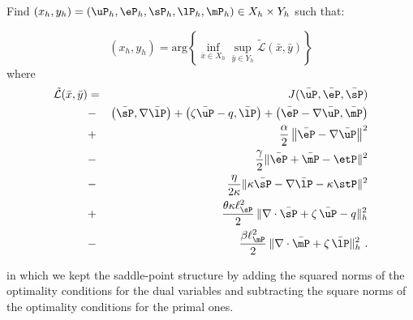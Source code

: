 \begin{tcolorbox}[colback=black!10!white, boxrule=0pt, halign=justify]
	\begin{problem*}[P2$_{h}$]
		Find $(x_h,y_h)=\left ( \uP_h, \eP_h, \sP_h, \lP_h, \mP_h\right ) \in X_h\times Y_h$ such that:
		
		\begin{equation}
			(x_h,y_h)= \mbox{arg} \left \{ \inf_{\bar{x}\in X_h} \sup_{\bar{y}\in Y_h} 
			\tilde{\mathcal{L}}(\bar{x},\bar{y})
			\right \}
		\end{equation}
		where
		\begin{eqnarray}
			\tilde{\mathcal{L}}(\bar{x},\bar{y})&=&J(\bar{\uP},\bar{\eP},\bar{\sP}) \nonumber \\
			&-&\left ( \bar{\sP},\nabla \bar{\lP} \right ) + \left (\zeta \bar{\uP} - q , \bar{\lP} \right )  
			+ \left ( \bar{\eP}-\nabla \bar{\uP}, \bar{\mP} \right ) \nonumber \\
			&+&\frac{\alpha}{2} \left \| \bar{\eP} - \nabla \bar{\uP} \right \|^2 \nonumber \\
			&-&\frac{\gamma}{2} \|\bar{\eP}+\bar{\mP}-\etP\|^2 \nonumber \\
			&-&\frac{\eta}{2\kappa} \|\kappa \bar{\sP} - \nabla \bar{\lP} - \kappa \stP\|^2 \nonumber \\
			&+& \frac{\theta \kappa \ell_{\sP}^2 }{2}\, \|\nabla \cdot \bar{\sP} + \zeta\, \bar{\uP} - q \|_h^2 \nonumber \\
			&-& \frac{\beta \ell_{\mP}^2 }{2}\, \|\nabla \cdot \bar{\mP} + \zeta\, \bar{\lP} \|_h^2~. \label{eq:discLag}
		\end{eqnarray}
	\end{problem*}
\end{tcolorbox}
\noindent
in which we kept the saddle-point structure by adding the squared norms of the optimality conditions for the dual variables and subtracting the square norms of the optimality conditions for the primal ones.

